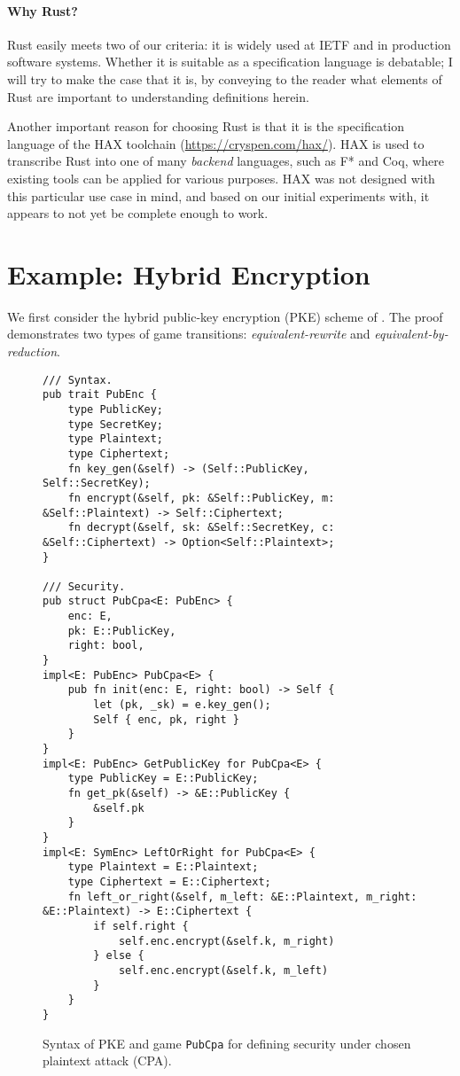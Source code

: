 \documentclass{article}
\begin{document}
\paragraph{Why Rust?}
%
Rust easily meets two of our criteria: it is widely used at IETF and in
production software systems.
%
Whether it is suitable as a specification language is debatable; I will try to
make the case that it is, by conveying to the reader what elements of Rust are
important to understanding definitions herein.

Another important reason for choosing Rust is that it is the specification
language of the HAX toolchain (\url{https://cryspen.com/hax/}).
%
HAX is used to transcribe Rust into one of many \emph{backend} languages, such
as F* and Coq, where existing tools can be applied for various purposes.
%
HAX was not designed with this particular use case in mind, and based on our
initial experiments with, it appears to not yet be complete enough to work.



\section{Example: Hybrid Encryption}\label{sec/hybrid}

We first consider the hybrid public-key encryption (PKE) scheme of
\cite[Chapter~15]{joy}.
%
The proof demonstrates two types of game transitions: \emph{equivalent-rewrite}
and \emph{equivalent-by-reduction}.


\begin{figure}[t]
\begin{lstlisting}
/// Syntax.
pub trait PubEnc {
    type PublicKey;
    type SecretKey;
    type Plaintext;
    type Ciphertext;
    fn key_gen(&self) -> (Self::PublicKey, Self::SecretKey);
    fn encrypt(&self, pk: &Self::PublicKey, m: &Self::Plaintext) -> Self::Ciphertext;
    fn decrypt(&self, sk: &Self::SecretKey, c: &Self::Ciphertext) -> Option<Self::Plaintext>;
}

/// Security.
pub struct PubCpa<E: PubEnc> {
    enc: E,
    pk: E::PublicKey,
    right: bool,
}
impl<E: PubEnc> PubCpa<E> {
    pub fn init(enc: E, right: bool) -> Self {
        let (pk, _sk) = e.key_gen();
        Self { enc, pk, right }
    }
}
impl<E: PubEnc> GetPublicKey for PubCpa<E> {
    type PublicKey = E::PublicKey;
    fn get_pk(&self) -> &E::PublicKey {
        &self.pk
    }
}
impl<E: SymEnc> LeftOrRight for PubCpa<E> {
    type Plaintext = E::Plaintext;
    type Ciphertext = E::Ciphertext;
    fn left_or_right(&self, m_left: &E::Plaintext, m_right: &E::Plaintext) -> E::Ciphertext {
        if self.right {
            self.enc.encrypt(&self.k, m_right)
        } else {
            self.enc.encrypt(&self.k, m_left)
        }
    }
}
\end{lstlisting}
  \caption{Syntax of PKE and game \lstinline{PubCpa}
  for defining security under chosen plaintext attack (CPA).}
  \label{fig/pubenc/security}
  \label{fig/pubenc/syntax}
\end{figure}
\end{document}
